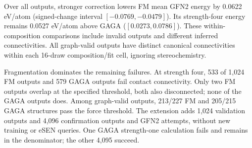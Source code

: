 Over all outputs, stronger correction lowers FM mean GFN2 energy by 0.0622 eV/atom (signed-change interval $[-0.0769,-0.0479]$). Its strength-four energy remains 0.0527 eV/atom above GAGA ($[0.0273,0.0786]$). These within-composition comparisons include invalid outputs and different inferred connectivities. All graph-valid outputs have distinct canonical connectivities within each 16-draw composition/fit cell, ignoring stereochemistry.

Fragmentation dominates the remaining failures. At strength four, 533 of 1,024 FM outputs and 579 GAGA outputs fail contact connectivity. Only two FM outputs overlap at the specified threshold, both also disconnected; none of the GAGA outputs does. Among graph-valid outputs, 213/227 FM and 205/215 GAGA structures pass the force threshold. The extension adds 1,024 validation outputs and 4,096 confirmation outputs and GFN2 attempts, without new training or eSEN queries. One GAGA strength-one calculation fails and remains in the denominator; the other 4,095 succeed.
